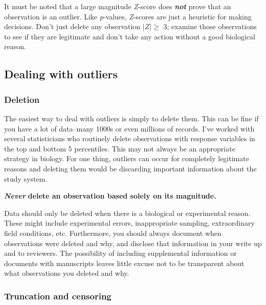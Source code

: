 \documentclass[
  13,
  letterpaper,
]{report}
\begin{document}
It must be noted that a large magnitude \emph{Z}-score does
\textbf{\emph{not}} prove that an observation is an outlier. Like
\emph{p}-values, \emph{Z}-scores are just a heuristic for making
decisions. Don't just delete any observation \(|Z|\ge\) 3; examine those
observations to see if they are legitimate and don't take any action
without a good biological reason.

\subsection{Dealing with outliers}\label{dealing-with-outliers}

\subsubsection{Deletion}\label{deletion}

The easiest way to deal with outliers is simply to delete them. This can
be fine if you have a lot of data--many 1000s or even millions of
records. I've worked with several statisticians who routinely delete
observations with response variables in the top and bottom 5
percentiles. This may not always be an appropriate strategy in biology.
For one thing, outliers can occur for completely legitimate reasons and
deleting them would be discarding important information about the study
system.

\textbf{\emph{Never}} \textbf{delete an observation based solely on its
magnitude.}

Data should only be deleted when there is a biological or experimental
reason. These might include experimental errors, inappropriate sampling,
extraordinary field conditions, etc. Furthermore, you should always
document when observations were deleted and why, and disclose that
information in your write up and to reviewers. The possibility of
including supplemental information or documents with manuscripts leaves
little excuse not to be transparent about what observations you deleted
and why.

\subsubsection{Truncation and censoring}\label{truncation-and-censoring}
\end{document}
